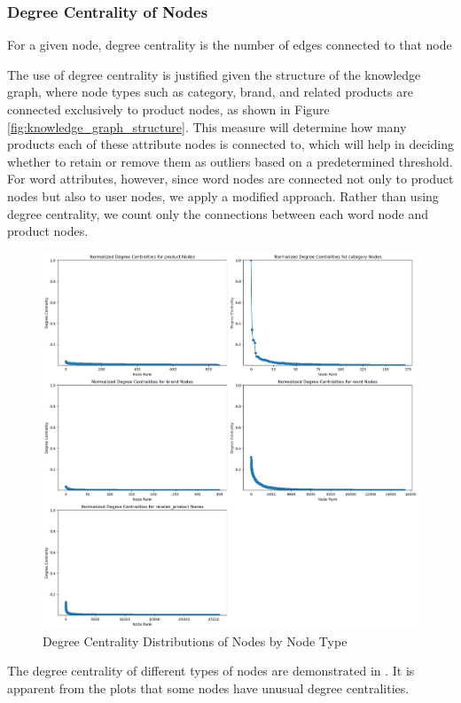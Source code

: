 \subsubsection*{Degree Centrality of Nodes}
For a given node, degree centrality is the number of edges connected to that node
\parencite{bloch2023centrality}

The use of degree centrality is justified given the structure of the knowledge
graph, where node types such as category, brand, and related products are connected
exclusively to product nodes, as shown in Figure \ref{fig:knowledge_graph_structure}. This measure will determine
how many products each of these attribute nodes is connected to, which will help
in deciding whether to retain or remove them as outliers based on a
predetermined threshold. For word attributes, however, since word nodes are connected
not only to product nodes but also to user nodes, we apply a modified approach. Rather
than using degree centrality, we count only the connections between each word
node and product nodes.

\begin{figure}[h!]
	\begin{center}
		\includegraphics[width=\columnwidth, keepaspectratio=true]{images/degree_centrality_distributions_by_node_type.png}
		\caption{Degree Centrality Distributions of Nodes by Node Type}
		\label{fig:degree_centrality_distributions_by_node_type}
	\end{center}
\end{figure}
The degree centrality of different types of nodes are demonstrated in .
It is apparent from the plots that some nodes have unusual degree centralities.

